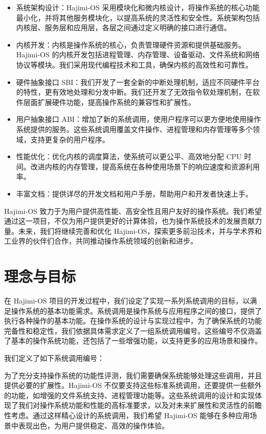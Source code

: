 \documentclass[UTF8]{article}
\begin{document}
\begin{itemize}
  \item 系统架构设计：Hajimi-OS 采用模块化和微内核设计，将操作系统的核心功能最小化，并将其他服务模块化，以提高系统的灵活性和安全性。系统架构包括内核层、服务层和应用层，各层之间通过定义明确的接口进行通信。
  \item 内核开发：内核是操作系统的核心，负责管理硬件资源和提供基础服务。Hajimi-OS 的内核开发包括进程管理、内存管理、设备驱动、文件系统和网络协议等模块。我们采用现代编程技术和工具，确保内核的高效性和可靠性。
  \item 硬件抽象接口 SBI：我们开发了一套全新的中断处理机制，适应不同硬件平台的特性，更有效地处理和分发中断。我们还开发了无效指令软处理机制，在软件层面扩展硬件功能，提高操作系统的兼容性和扩展性。
  \item 用户抽象接口 ABI：增加了新的系统调用，使用户程序可以更方便地使用操作系统提供的服务。这些系统调用覆盖文件操作、进程管理和内存管理等多个领域，支持更复杂的用户程序。
  \item 性能优化：优化内核的调度算法，使系统可以更公平、高效地分配 CPU 时间。改进内核的内存管理，提高系统在各种使用场景下的响应速度和资源利用率。
  \item 丰富文档：提供详尽的开发文档和用户手册，帮助用户和开发者快速上手。
\end{itemize}

Hajimi-OS 致力于为用户提供高性能、高安全性且用户友好的操作系统。我们希望通过这一项目，不仅为用户提供更好的计算体验，也为操作系统技术的发展贡献力量。未来，我们将继续完善和优化 Hajimi-OS，探索更多前沿技术，并与学术界和工业界的伙伴们合作，共同推动操作系统领域的创新和进步。

\section{理念与目标}
在 Hajimi-OS 项目的开发过程中，我们设定了实现一系列系统调用的目标，以满足操作系统的基本功能需求。系统调用是操作系统与应用程序之间的接口，提供了执行各种操作的基本功能。在操作系统的设计与实现过程中，为了确保系统的功能完备性和稳定性，我们依据具体需求定义了一组系统调用编号。这些编号不仅涵盖了基本的操作系统功能，还包括了一些增强功能，以支持更多的应用场景和操作。

我们定义了如下系统调用编号：


为了充分支持操作系统的功能性评测，我们需要确保系统能够处理这些调用，并且提供必要的扩展性。Hajimi-OS 不仅要支持这些标准系统调用，还要提供一些额外的功能，如增强的文件系统支持、进程管理功能等。这些系统调用的设计和实现体现了我们对操作系统功能和性能的高标准要求，以及对未来扩展性和灵活性的前瞻性考虑。通过这样精心设计的系统调用，我们希望 Hajimi-OS 能够在多种应用场景中表现出色，为用户提供稳定、高效的操作体验。
\end{document}
